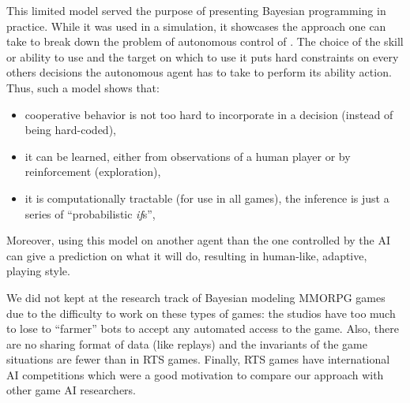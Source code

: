 This limited model served the purpose of presenting Bayesian programming in practice. While it was used in a simulation, it showcases the approach one can take to break down the problem of autonomous control of . The choice of the skill or ability to use and the target on which to use it puts hard constraints on every others decisions the autonomous agent has to take to perform its ability action. Thus, such a model shows that:
\begin{itemize}
    \item cooperative behavior is not too hard to incorporate in a decision (instead of being hard-coded),
    \item it can be learned, either from observations of a human player or by reinforcement (exploration),
    \item it is computationally tractable (for use in all games), the inference is just a series of ``probabilistic \textit{if}s'',
\end{itemize}
Moreover, using this model on another agent than the one controlled by the AI can give a prediction on what it will do, resulting in human-like, adaptive, playing style.

We did not kept at the research track of Bayesian modeling MMORPG games due to the difficulty to work on these types of games: the studios have too much to lose to ``farmer'' bots to accept any automated access to the game. Also, there are no sharing format of data (like replays) and the invariants of the game situations are fewer than in RTS games. Finally, RTS games have international AI competitions which were a good motivation to compare our approach with other game AI researchers.
